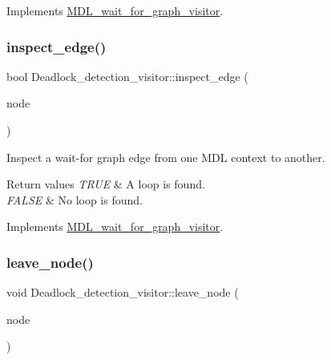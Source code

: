 Implements \mbox{\hyperlink{classMDL__wait__for__graph__visitor}{M\+D\+L\+\_\+wait\+\_\+for\+\_\+graph\+\_\+visitor}}.

\mbox{\label{classDeadlock__detection__visitor_a5026f36978b470869539c8171ad26875}} 
\subsubsection{\texorpdfstring{inspect\+\_\+edge()}{inspect\_edge()}}
{\footnotesize\ttfamily bool Deadlock\+\_\+detection\+\_\+visitor\+::inspect\+\_\+edge (\begin{DoxyParamCaption}\item[{\mbox{\hyperlink{classMDL__context}{M\+D\+L\+\_\+context}} $\ast$}]{node }\end{DoxyParamCaption})\hspace{0.3cm}{\ttfamily [virtual]}}

Inspect a wait-\/for graph edge from one M\+DL context to another.


\begin{DoxyRetVals}{Return values}
{\em T\+R\+UE} & A loop is found. \\
\hline
{\em F\+A\+L\+SE} & No loop is found. \\
\hline
\end{DoxyRetVals}


Implements \mbox{\hyperlink{classMDL__wait__for__graph__visitor}{M\+D\+L\+\_\+wait\+\_\+for\+\_\+graph\+\_\+visitor}}.

\mbox{\label{classDeadlock__detection__visitor_aa56aca6948788aeb22c760d783884d7b}} 
\subsubsection{\texorpdfstring{leave\+\_\+node()}{leave\_node()}}
{\footnotesize\ttfamily void Deadlock\+\_\+detection\+\_\+visitor\+::leave\+\_\+node (\begin{DoxyParamCaption}\item[{\mbox{\hyperlink{classMDL__context}{M\+D\+L\+\_\+context}} $\ast$}]{node }\end{DoxyParamCaption})\hspace{0.3cm}{\ttfamily [virtual]}}

